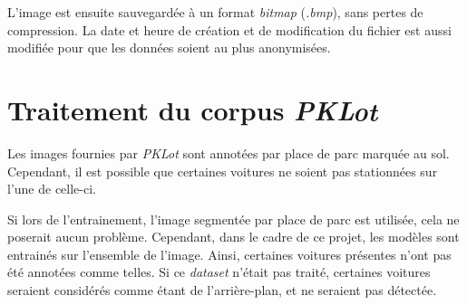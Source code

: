 L'image est ensuite sauvegardée à un format \textit{bitmap} (\textit{.bmp}), sans pertes de compression. La date et heure de création et de modification du fichier est aussi modifiée pour que les données soient au plus anonymisées.

\section{Traitement du corpus \textit{PKLot}} \label{realisation.dataset}

Les images fournies par \textit{PKLot} sont annotées par place de parc marquée au sol. Cependant, il est possible que certaines voitures ne soient pas stationnées sur l'une de celle-ci. 

Si lors de l'entrainement, l'image segmentée par place de parc est utilisée, cela ne poserait aucun problème. Cependant, dans le cadre de ce projet, les modèles sont entrainés sur l'ensemble de l'image. Ainsi, certaines voitures présentes n'ont pas été annotées comme telles. Si ce \textit{dataset} n'était pas traité, certaines voitures seraient considérés comme étant de l'arrière-plan, et ne seraient pas détectée. 

